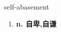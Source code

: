 
\begin{frame}
{\huge self-abasement}
\begin{center}
\begin{enumerate}\Large
  \item \textbf{n. 自卑,自谦}
\end{enumerate}
\end{center}
\end{frame}
